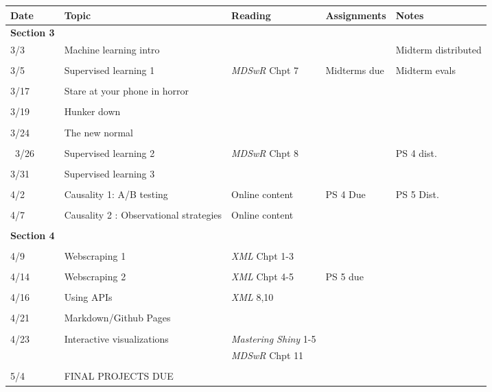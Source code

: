 \documentclass[11pt]{article}
\begin{document}
\begin{small}
\begin{center}
\begin{tabular}{p{1.5cm} p{4cm} p{3.5cm} p{3cm} p{4cm}}
  \toprule
  Date & Topic & Reading & Assignments & Notes  \\
  \midrule
\textbf{Section 3} \\
3/3 & Machine learning intro  & & & Midterm distributed\\
\\
3/5 & Supervised learning 1& \textit{MDSwR} Chpt 7 &  Midterms due& Midterm evals\\
\\
3/17 & Stare at your phone in horror\\
\\
3/19 & Hunker down \\
\\
3/24 & The new normal \\
\\\
3/26 & Supervised learning 2& \textit{MDSwR} Chpt 8   & & PS 4 dist.\\
\\
3/31  &  Supervised learning 3 & \\
\\
4/2  & Causality 1: A/B testing & Online content & PS 4 Due & PS 5 Dist. \\
\\
4/7 & Causality 2 : Observational strategies &  Online content \\
\\
\textbf{Section 4} \\
\\
4/9 & Webscraping 1 & \textit{XML} Chpt 1-3\\
\\
4/14 & Webscraping 2 & \textit{XML} Chpt 4-5 & PS 5 due \\
\\
4/16 & Using APIs & \textit{XML} 8,10 \\
\\
4/21 & Markdown/Github Pages & \\
\\
4/23 &  Interactive visualizations & \textit{Mastering Shiny} 1-5 \\
& & \textit{MDSwR} Chpt 11 \\
\\
5/4 & FINAL PROJECTS DUE
\end{tabular}
\end{center}
\end{small}
\end{document}
